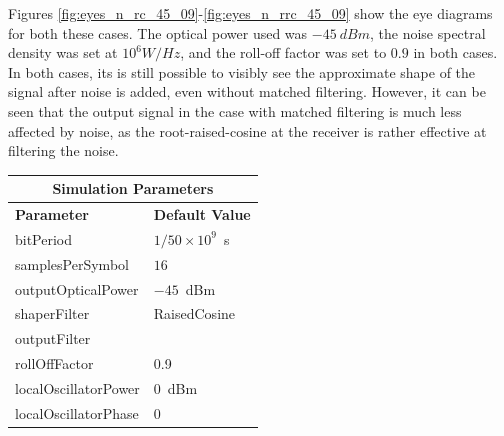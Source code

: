 \begin{refsection}
Figures \ref{fig:eyes_n_rc_45_09}-\ref{fig:eyes_n_rrc_45_09} show the eye
diagrams for both these cases. The optical power used was $-45~dBm$, the
noise spectral density was set at $10^6 W/Hz$, and the roll-off factor was set
to $0.9$ in both cases. In both cases, its is still possible to visibly see the
approximate shape of the signal after noise is added, even without matched
filtering. However, it can be seen that the output signal in the case with
matched filtering is much less affected by noise, as the root-raised-cosine at
the receiver is rather effective at filtering the noise.

\begin{table}[H]
	\centering
	\footnotesize
	\begin{tabular}{|l|l|}
		\hline
		\multicolumn{2}{|c|}{ \textbf{Simulation Parameters} } \\
		\hline
		\textbf{Parameter}     & \textbf{Default Value}                                     \\\hline
		bitPeriod              & $1/50\times10^9$~s														\\\hline
		samplesPerSymbol       & $16$                                                       \\\hline
		outputOpticalPower     & $-45$~dBm 													\\ \hline
		shaperFilter	       & RaisedCosine												\\ \hline
		outputFilter		   & 															\\ \hline
		rollOffFactor		   & 0.9														\\ \hline
		localOscillatorPower   & $0$~dBm                                                    \\ \hline
		localOscillatorPhase   & $0$                                                        \\ \hline

\end{tabular}
\end{table}
\end{refsection}
